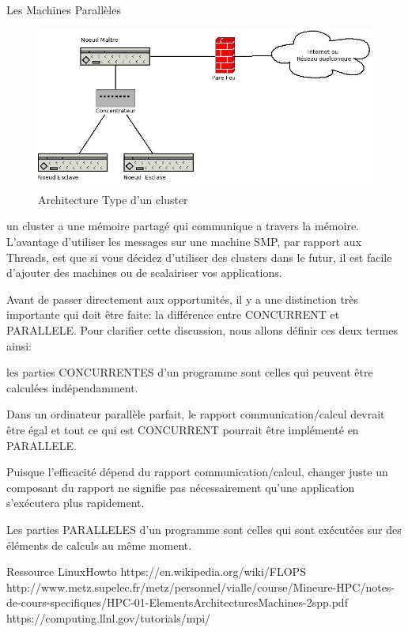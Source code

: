 \documentclass[12pt,a4paper,titlepage]{article}%
\makeatletter
\def\subsection{\@startsection {subsection}{2}{\z@}{12pt plus 2pt minus 2pt}
{12pt plus 2pt minus 2pt}{\bf}}
\makeatother
\begin{document}
\subsection{Les Machines Parallèles}

\begin{figure}[htp]
\centering
\includegraphics[scale=0.5]{./cluster.jpeg}
\caption{Architecture Type d'un cluster}
\label{}
\end{figure}



un cluster a une mémoire partagé qui communique a travers la mémoire. 
 L'avantage d'utiliser les messages sur une machine SMP, par rapport aux Threads, est que si vous décidez d'utiliser des clusters dans le futur, il est facile d'ajouter des machines ou de scalairiser vos applications.

Avant de passer directement aux opportunités, il y a une distinction très importante qui doit être faite: la différence entre CONCURRENT et PARALLELE. Pour clarifier cette discussion, nous allons définir ces deux termes ainsi:

les parties CONCURRENTES d'un programme sont celles qui peuvent être calculées indépendamment.

Dans un ordinateur parallèle parfait, le rapport communication/calcul devrait être égal et tout ce qui est CONCURRENT pourrait être implémenté en PARALLELE. 

Puisque l'efficacité dépend du rapport communication/calcul, changer juste un composant du rapport ne signifie pas nécessairement qu'une application s'exécutera plus rapidement.


Les parties PARALLELES d'un programme sont celles qui sont exécutées sur des éléments de calculs au même moment.


\newpage

Ressource LinuxHowto 
https://en.wikipedia.org/wiki/FLOPS
http://www.metz.supelec.fr/metz/personnel/vialle/course/Mineure-HPC/notes-de-cours-specifiques/HPC-01-ElementsArchitecturesMachines-2spp.pdf
https://computing.llnl.gov/tutorials/mpi/
\end{document}

